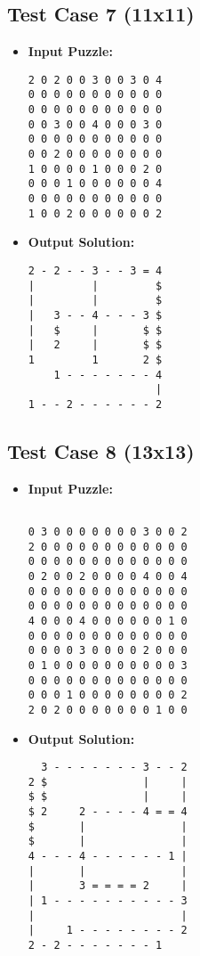 \subsection{Test Case 7 (11x11)}
\begin{itemize}
    \item \textbf{Input Puzzle:}
    \begin{verbatim}
2 0 2 0 0 3 0 0 3 0 4
0 0 0 0 0 0 0 0 0 0 0
0 0 0 0 0 0 0 0 0 0 0
0 0 3 0 0 4 0 0 0 3 0
0 0 0 0 0 0 0 0 0 0 0
0 0 2 0 0 0 0 0 0 0 0
1 0 0 0 0 1 0 0 0 2 0
0 0 0 1 0 0 0 0 0 0 4
0 0 0 0 0 0 0 0 0 0 0
1 0 0 2 0 0 0 0 0 0 2
    \end{verbatim}
    \item \textbf{Output Solution:}
    \begin{verbatim}
2 - 2 - - 3 - - 3 = 4
|         |         $
|         |         $
|   3 - - 4 - - - 3 $
|   $     |       $ $
|   2     |       $ $
1         1       2 $
    1 - - - - - - - 4
                    |
1 - - 2 - - - - - - 2
    \end{verbatim}
\end{itemize}

\subsection{Test Case 8 (13x13)}
\begin{itemize}
    \item \textbf{Input Puzzle:}
    \begin{verbatim}

0 3 0 0 0 0 0 0 0 3 0 0 2
2 0 0 0 0 0 0 0 0 0 0 0 0
0 0 0 0 0 0 0 0 0 0 0 0 0
0 2 0 0 2 0 0 0 0 4 0 0 4
0 0 0 0 0 0 0 0 0 0 0 0 0
0 0 0 0 0 0 0 0 0 0 0 0 0
4 0 0 0 4 0 0 0 0 0 0 1 0
0 0 0 0 0 0 0 0 0 0 0 0 0
0 0 0 0 3 0 0 0 0 2 0 0 0
0 1 0 0 0 0 0 0 0 0 0 0 3
0 0 0 0 0 0 0 0 0 0 0 0 0
0 0 0 1 0 0 0 0 0 0 0 0 2
2 0 2 0 0 0 0 0 0 0 1 0 0

    \end{verbatim}
    \item \textbf{Output Solution:}
    \begin{verbatim}
  3 - - - - - - - 3 - - 2
2 $               |     |
$ $               |     |
$ 2     2 - - - - 4 = = 4
$       |               |
$       |               |
4 - - - 4 - - - - - - 1 |
|       |               |
|       3 = = = = 2     |
| 1 - - - - - - - - - - 3
|                       |
|     1 - - - - - - - - 2
2 - 2 - - - - - - - 1    
    \end{verbatim}
\end{itemize}

